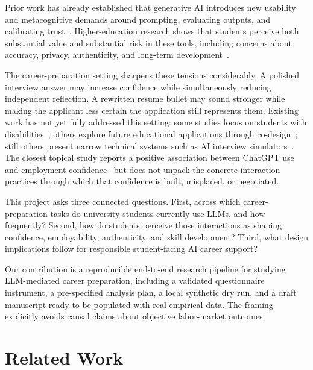 \documentclass[sigconf,review,anonymous]{acmart}
\begin{document}
Prior work has already established that generative AI introduces new
usability and metacognitive demands around prompting, evaluating outputs,
and calibrating trust~\cite{tankelevitch2024metacognitive}.  Higher-education
research shows that students perceive both substantial value and substantial
risk in these tools, including concerns about accuracy, privacy, authenticity,
and long-term development~\cite{chan2023studentsvoices, jochim2024teachingtesting}.

The career-preparation setting sharpens these tensions considerably.  A
polished interview answer may increase confidence while simultaneously
reducing independent reflection.  A rewritten resume bullet may sound
stronger while making the applicant less certain the application still
represents them.  Existing work has not yet fully addressed this setting:
some studies focus on students with disabilities~\cite{atcheson2025disabilitygenai};
others explore future educational applications through co-design~\cite{prasad2025multimodal};
still others present narrow technical systems such as AI interview
simulators~\cite{lee2024vrinterview}.  The closest topical study reports a
positive association between ChatGPT use and employment
confidence~\cite{xiao2025employmentconfidence} but does not unpack the
concrete interaction practices through which that confidence is built,
misplaced, or negotiated.

This project asks three connected questions.  First, across which
career-preparation tasks do university students currently use LLMs, and how
frequently?  Second, how do students perceive those interactions as shaping
confidence, employability, authenticity, and skill development?  Third,
what design implications follow for responsible student-facing AI career
support?

Our contribution is a reproducible end-to-end research pipeline for
studying LLM-mediated career preparation, including a validated
questionnaire instrument, a pre-specified analysis plan, a local synthetic
dry run, and a draft manuscript ready to be populated with real empirical
data.  The framing explicitly avoids causal claims about objective
labor-market outcomes.

\section{Related Work}
\end{document}
